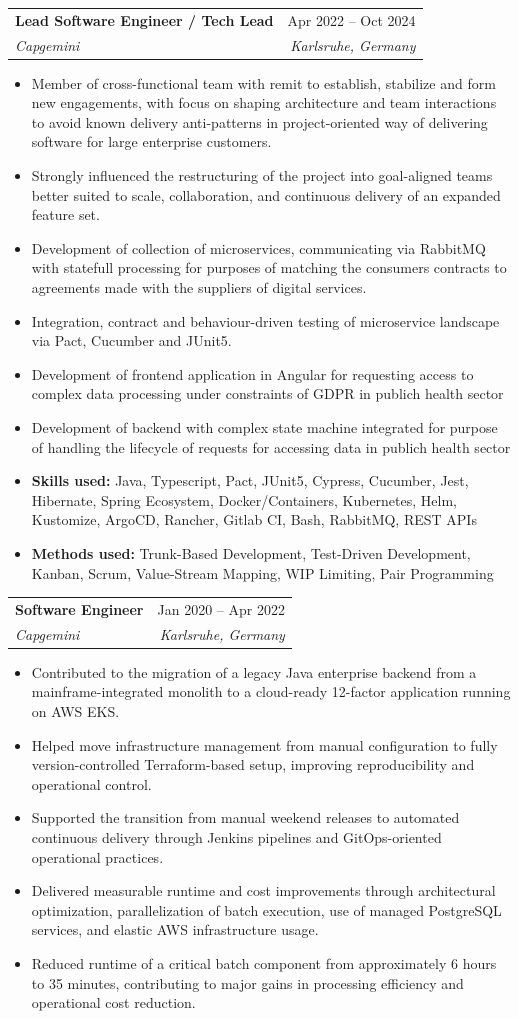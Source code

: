 \documentclass[a4paper,12pt]{article}
\makeatletter
\newcommand{\resumeItem}[1]{
	\item\small{
		{#1 \vspace{-2pt}}
	}
}
\newcommand{\resumeSubheading}[4]{
	\vspace{-2pt}\item
	\begin{tabular*}{0.97\textwidth}[t]{l@{\extracolsep{\fill}}r}
		\textbf{#1} & #2 \\
		\textit{\small#3} & \textit{\small #4} \\
	\end{tabular*}\vspace{-7pt}
}
\newcommand{\resumeItemListStart}{\begin{itemize}}
\newcommand{\resumeItemListEnd}{\end{itemize}\vspace{-5pt}}
\makeatother
\begin{document}
	\resumeSubheading
	{Lead Software Engineer / Tech Lead}{Apr 2022 -- Oct 2024}
	{Capgemini}{Karlsruhe, Germany}
		\resumeItemListStart
			\resumeItem{Member of cross-functional team with remit to establish, stabilize and form new engagements, with focus on shaping architecture and team interactions to avoid known delivery anti-patterns in project-oriented way of delivering software for large enterprise customers.}
			\resumeItem{Strongly influenced the restructuring of the project into goal-aligned teams better suited to scale, collaboration, and continuous delivery of an expanded feature set.}
			\resumeItem{Development of collection of microservices, communicating via RabbitMQ with statefull processing for purposes of matching the consumers contracts to agreements made with the suppliers of digital services.}
			\resumeItem{Integration, contract and behaviour-driven testing of microservice landscape via Pact, Cucumber and JUnit5.}
			\resumeItem{Development of frontend application in Angular for requesting access to complex data processing under constraints of GDPR in publich health sector}
			\resumeItem{Development of backend with complex state machine integrated for purpose of handling the lifecycle of requests for accessing data in publich health sector}
			\resumeItem{\textbf{Skills used: }{Java, Typescript, Pact, JUnit5, Cypress, Cucumber, Jest, Hibernate, Spring Ecosystem, Docker/Containers, Kubernetes, Helm, Kustomize, ArgoCD, Rancher, Gitlab CI, Bash, RabbitMQ, REST APIs}}
			\resumeItem{\textbf{Methods used: }{Trunk-Based Development, Test-Driven Development, Kanban, Scrum, Value-Stream Mapping, WIP Limiting, Pair Programming}}
		\resumeItemListEnd

\resumeSubheading
{Software Engineer}{Jan 2020 -- Apr 2022}
{Capgemini}{Karlsruhe, Germany}
\resumeItemListStart
\resumeItem{Contributed to the migration of a legacy Java enterprise backend from a mainframe-integrated monolith to a cloud-ready 12-factor application running on AWS EKS.}
\resumeItem{Helped move infrastructure management from manual configuration to fully version-controlled Terraform-based setup, improving reproducibility and operational control.}
\resumeItem{Supported the transition from manual weekend releases to automated continuous delivery through Jenkins pipelines and GitOps-oriented operational practices.}
\resumeItem{Delivered measurable runtime and cost improvements through architectural optimization, parallelization of batch execution, use of managed PostgreSQL services, and elastic AWS infrastructure usage.}
\resumeItem{Reduced runtime of a critical batch component from approximately 6 hours to 35 minutes, contributing to major gains in processing efficiency and operational cost reduction.}
\resumeItemListEnd
\end{document}
